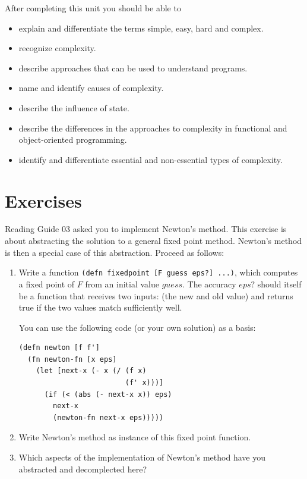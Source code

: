 \documentclass[11pt,a4paper]{article}
\begin{document}
After completing this unit you should be able to

\begin{itemize}
    \item explain and differentiate the terms simple, easy, hard and complex.
    \item recognize complexity.
    \item describe approaches that can be used to understand programs.
    \item name and identify causes of complexity.
    \item describe the influence of state.
    \item describe the differences in the approaches to complexity in functional and object-oriented programming.
    \item identify and differentiate essential and non-essential types of complexity.
\end{itemize}



\section{Exercises}

\begin{exercise}

Reading Guide 03 asked you to implement Newton's method.
This exercise is about abstracting the solution to a general fixed point method.
Newton's method is then a special case of this abstraction.
Proceed as follows:
    
\begin{enumerate}[label=\alph*)]
\item Write a function \texttt{(defn fixedpoint [F guess eps?] ...)}, which computes a fixed point of $F$ from an initial value $guess$.
    The accuracy $eps?$ should itself be a function that receives two inputs: (the new and old value) and returns true if the two values match sufficiently well.

    You can use the following code (or your own solution) as a basis:

\begin{verbatim}
(defn newton [f f']
  (fn newton-fn [x eps]
    (let [next-x (- x (/ (f x)
                         (f' x)))]
      (if (< (abs (- next-x x)) eps)
        next-x
        (newton-fn next-x eps)))))
\end{verbatim}

\item Write Newton's method as instance of this fixed point function.
\item Which aspects of the implementation of Newton's method have you abstracted and decomplected here?
\end{enumerate}
\end{exercise}
\end{document}
